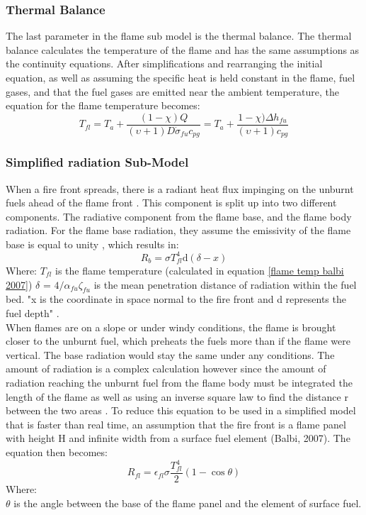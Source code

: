 \documentclass{article}
\begin{document}
\subsubsection*{Thermal Balance}
\indent The last parameter in the flame sub model is the thermal balance. The thermal balance calculates the temperature of the flame and has the same assumptions as the continuity equations. After simplifications and rearranging the initial equation, as well as assuming the specific heat is held constant in the flame, fuel gases, and that the fuel gases are emitted near the ambient temperature, the equation for the flame temperature becomes:
\begin{equation}
	\label{flame temp balbi 2007}
	T_{fl} = T_a + \frac {(1 - \chi) Q}{(\upsilon + 1) D \dot{\sigma} _ {fu} c_{pg}} = T_a + \frac {1 - \chi) \Delta h _ {fu} }{(\upsilon + 1) c_{pg}}
\end{equation}
\subsubsection{Simplified radiation Sub-Model}
\indent When a fire front spreads, there is a radiant heat flux impinging on the unburnt fuels ahead of the flame front \citep{Balbi2007}. This component is split up into two different components. The radiative component from the flame base, and the flame body radiation. For the flame base radiation, they assume the emissivity of the flame base is equal to unity \citep{Balbi2007}, which results in:
\begin{equation}
	\label{R_b 2007}
	R_b = \sigma T^{4}_{fl} \mathrm{d}(\delta - x)
\end{equation}
Where: $T_{fl}$ is the flame temperature (calculated in equation \ref{flame temp balbi 2007}) $\delta$ = $4/ \alpha _{fu} \zeta _ {fu}$ is the mean penetration distance of radiation within the fuel bed. "x is the coordinate in space normal to the fire front and d represents the fuel depth" \citep{Balbi2007}. \\
\indent When flames are on a slope or under windy conditions, the flame is brought closer to the unburnt fuel, which preheats the fuels more than if the flame were vertical. The base radiation would stay the same under any conditions. The amount of radiation is a complex calculation however since the amount of radiation reaching the unburnt fuel from the flame body must be integrated the length of the flame as well as using an inverse square law to find the distance r between the two areas \citep{Balbi2007}. To reduce this equation to be used in a simplified model that is faster than real time, an assumption that the fire front is a flame panel with height H and infinite width from a surface fuel element (Balbi, 2007). The equation then becomes:
\begin{equation}
	\label{flame_base_2007}
	R_{fl} = \epsilon_{fl} \sigma \frac {T^{4}_{fl}} {2} (1 - \cos \theta)
\end{equation}
Where:\\
$\theta $ is the angle between the base of the flame panel and the element of surface fuel. 
\end{document}
